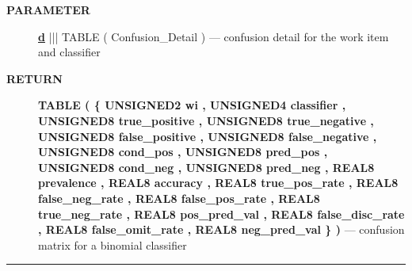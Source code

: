 \par
\begin{description}
\item [\colorbox{tagtype}{\color{white} \textbf{\textsf{PARAMETER}}}] \textbf{\underline{d}} ||| TABLE ( Confusion\_Detail ) --- confusion detail for the work item and classifier
\end{description}







\par
\begin{description}
\item [\colorbox{tagtype}{\color{white} \textbf{\textsf{RETURN}}}] \textbf{TABLE ( \{ UNSIGNED2 wi , UNSIGNED4 classifier , UNSIGNED8 true\_positive , UNSIGNED8 true\_negative , UNSIGNED8 false\_positive , UNSIGNED8 false\_negative , UNSIGNED8 cond\_pos , UNSIGNED8 pred\_pos , UNSIGNED8 cond\_neg , UNSIGNED8 pred\_neg , REAL8 prevalence , REAL8 accuracy , REAL8 true\_pos\_rate , REAL8 false\_neg\_rate , REAL8 false\_pos\_rate , REAL8 true\_neg\_rate , REAL8 pos\_pred\_val , REAL8 false\_disc\_rate , REAL8 false\_omit\_rate , REAL8 neg\_pred\_val \} )} --- confusion matrix for a binomial classifier
\end{description}




\rule{\linewidth}{0.5pt}
